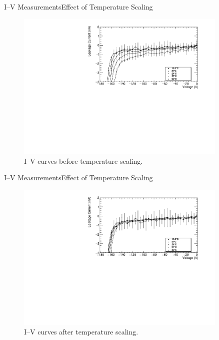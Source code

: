 \documentclass{beamer}
\begin{document}
    \begin{frame}{I--V Measurements}{Effect of Temperature Scaling}
        \begin{figure}
            \centering
            \includegraphics[width=0.9\textwidth]{Unscaled_IV_0503_bigpoints.pdf}
            \caption{\footnotesize I--V curves before temperature scaling.}
            \label{fig:NonScaledIVCurves}
        \end{figure}
    \end{frame}
    
    \begin{frame}{I--V Measurements}{Effect of Temperature Scaling}
        \begin{figure}
            \centering
            \includegraphics[width=0.9\textwidth]{Scaled_IV_0503_bigpoints.pdf}
            \caption{\footnotesize I--V curves after temperature scaling.}
            \label{fig:ScaledIVCurves}
        \end{figure}
    \end{frame}
    
\end{document}
